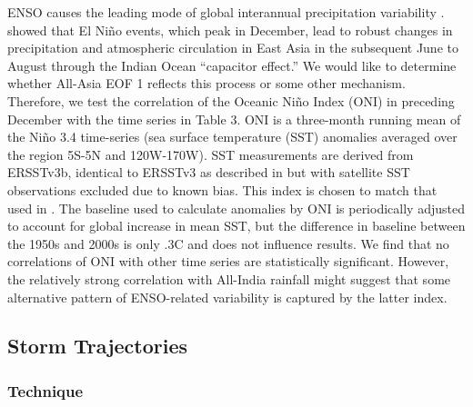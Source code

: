 \documentclass[12pt]{article}
\begin{document}
	ENSO causes the leading mode of global interannual precipitation variability \citep{Dai1997}. \cite{Xie2009} showed that El Ni\~no events, which peak in December, lead to robust changes in precipitation and atmospheric circulation in East Asia in the subsequent June to August through the Indian Ocean ``capacitor effect.'' We would like to determine whether All-Asia EOF 1 reflects this process or some other mechanism. Therefore, we test the correlation of the Oceanic Ni\~no Index (ONI) in preceding December with the time series in Table 3. ONI is a three-month running mean of the Ni\~no 3.4 time-series (sea surface temperature (SST) anomalies averaged over the region 5\textdegree S-5\textdegree N and 120\textdegree W-170\textdegree W). SST measurements are derived from ERSSTv3b, identical to ERSSTv3 as described in \cite{Smith2008} but with satellite SST observations excluded due to known bias. This index is chosen to match that used in \cite{Xie2009}. The baseline used to calculate anomalies by ONI is periodically adjusted to account for global increase in mean SST, but the difference in baseline between the 1950s and 2000s is only .3\textdegree C and does not influence results. We find that no correlations of ONI with other time series are statistically significant. However, the relatively strong correlation with All-India rainfall might suggest that some alternative pattern of ENSO-related variability is captured by the latter index.
			
\subsection{Storm Trajectories}

\subsubsection{Technique}
\end{document}
